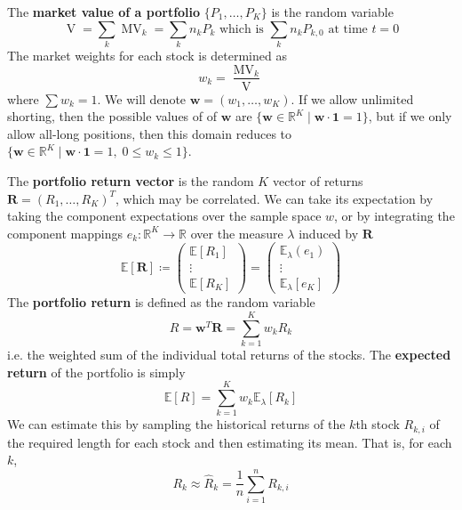 \documentclass{article}
\DeclareMathOperator{\MV}{MV}
\DeclareMathOperator{\V}{V}
\begin{document}
\begin{definition}
The \textbf{market value of a portfolio} $\{P_1, \ldots, P_K\}$ is the random variable 
\[\V = \sum_{k} \MV_{k} = \sum_k n_{k} P_{k} \text{ which is } \sum_k n_k P_{k, 0} \text{ at time } t = 0\]
The market weights for each stock is determined as 
\[w_{k} = \frac{\MV_{k}}{\V}\]
where $\sum w_{k} = 1$. We will denote $\mathbf{w} = (w_1, \ldots, w_K)$. If we allow unlimited shorting, then the possible values of of $\mathbf{w}$ are $\{\mathbf{w} \in \mathbb{R}^K \mid \mathbf{w} \cdot \mathbf{1} = 1\}$, but if we only allow all-long positions, then this domain reduces to $\{\mathbf{w} \in \mathbb{R}^K \mid \mathbf{w} \cdot \mathbf{1} = 1, \; 0 \leq w_k \leq 1\}$. 
\end{definition}

\begin{definition}
The \textbf{portfolio return vector} is the random $K$ vector of returns $\mathbf{R} = (R_1, \ldots, R_K)^T$, which may be correlated. We can take its expectation by taking the component expectations over the sample space $w$, or by integrating the component mappings $e _k: \mathbb{R}^K \rightarrow \mathbb{R}$ over the measure $\lambda$ induced by $\mathbf{R}$ 
\[\mathbb{E}[\mathbf{R}] \coloneqq \begin{pmatrix} \mathbb{E} [R_1] \\ \vdots \\ \mathbb{E} [R_K] \end{pmatrix} = \begin{pmatrix} \mathbb{E}_\lambda(e_1) \\ \vdots \\ \mathbb{E}_\lambda [e_K] \end{pmatrix}\]
The \textbf{portfolio return} is defined as the random variable 
\[R = \mathbf{w}^T \mathbf{R} = \sum_{k=1}^K w_{k} R_k\]
i.e. the weighted sum of the individual total returns of the stocks. The \textbf{expected return} of the portfolio is simply 
\[\mathbb{E}[R] = \sum_{k=1}^K w_k \mathbb{E}_\lambda [R_k]\]
We can estimate this by sampling the historical returns of the $k$th stock $R_{k, i}$ of the required length for each stock and then estimating its mean. That is, for each $k$, 
\[R_k \approx \hat{R}_k = \frac{1}{n} \sum_{i = 1}^n R_{k, i} \]
\end{definition}
\end{document}
